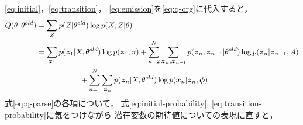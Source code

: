\eqref{eq:initial}，\eqref{eq:transition}，
\eqref{eq:emission}を\eqref{eq:q-org}に代入すると，
\begin{align}
  Q(\theta, \theta^{old}) &=  \sum_Zp(Z| \theta^{old})\log p(X, Z| \theta) \\
  &= \sum_{\bvec{z}_1}p(\bvec{z}_1|X,\theta^{old})\log p(\bvec{z}_1,\pi) + \sum_{n=2}^N\sum_{\bvec{z}_n,\bvec{z}_{n-1}}p(\bvec{z}_n,\bvec{z}_{n-1}|\theta^{old})\log p(\bvec{z}_n|\bvec{z}_{n-1},A) \\
  &{}\hspace{20mm} + \sum_{n=1}^N\sum_{\bvec{z}_n}p(\bvec{z}_n|X,\theta^{old})\log p(\bvec{x}_n|\bvec{z}_n,\bvec{\phi}) \label{eq:q-parse}
\end{align}
式\eqref{eq:q-parse}の各項について，
式\eqref{eq:initial-probability},
\eqref{eq:transition-probability}に気をつけながら
潜在変数の期待値についての表現に直すと，
